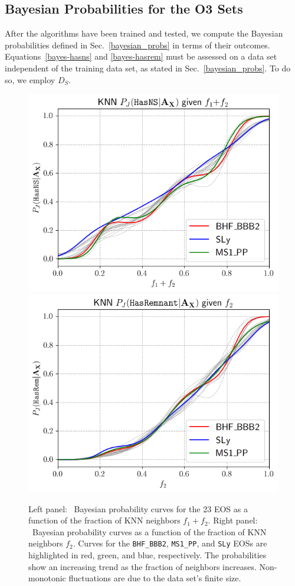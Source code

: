 \subsection{Bayesian Probabilities for the O3 Sets}

After the algorithms have been trained and tested, we compute the Bayesian probabilities defined in Sec.~\ref{bayesian_probs} in terms of their outcomes. Equations~\eqref{bayes-hasns} and
\eqref{bayes-hasrem} must be assessed on a data set independent of the training data set, as stated in Sec.~\ref{bayesian_probs}. To do so, we employ $D_S$.

\begin{figure}%
\includegraphics[width=0.45\linewidth]{KNN_3_eos_prob_plots_HasNS}
\includegraphics[width=0.45\linewidth]{KNN_3_eos_prob_plots_HasRem}
\caption{Left panel: \hasns\ Bayesian probability curves for the 23 \ac{EOS} as a function of the fraction of \ac{KNN} neighbors $f_1+f_2$. Right panel: \hasrem\ Bayesian probability curves as a function of the fraction of \ac{KNN} neighbors $f_2$. Curves for the {\tt BHF\_BBB2}, {\tt MS1\_PP}, and {\tt SLy} \ac{EOS}s are highlighted in red, green, and blue, respectively. The probabilities show an increasing trend as the fraction of neighbors increases. Non-monotonic fluctuations are due to the data set's finite size.}
\label{fig:bayesian_prob_fits_KNN}
\end{figure}

